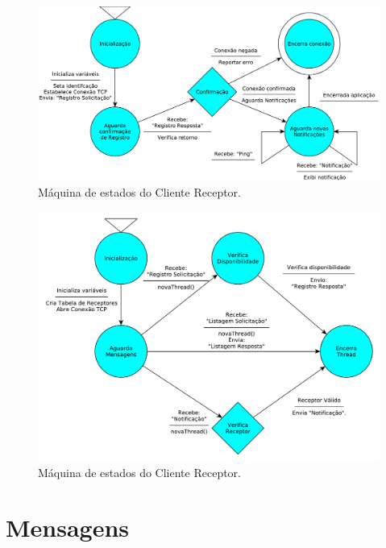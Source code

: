 \documentclass[12pt]{article}
\begin{document}
\begin{figure}%
	\centering
	\includegraphics[width=1\textwidth]{images/Protocolo_Cliente_Receptor.pdf}
	\caption{Máquina de estados do Cliente Receptor.}
	\label{fig:Emissor}
\end{figure}

\begin{figure}%
	\centering
	\includegraphics[width=1\textwidth]{images/Protocolo_Servidor.pdf}
	\caption{Máquina de estados do Cliente Receptor.}
	\label{fig:Servidor}
\end{figure}

\section{Mensagens}\label{sec:Mensagens}
\end{document}
